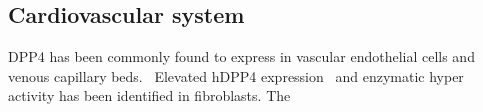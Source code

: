 \subsection{Cardiovascular system}
DPP4 has been commonly found to express in vascular endothelial cells and venous capillary beds.~\cite{Matheeussen2013,Shigeta2012} Elevated hDPP4 expression~\cite{Nemoto1999} and enzymatic hyper activity has been identified in fibroblasts. The  
